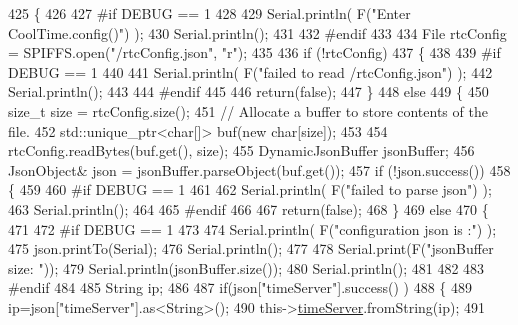 \begin{DoxyCode}
425 \{
426 
427 \textcolor{preprocessor}{#if DEBUG == 1 }
428 
429     Serial.println( F(\textcolor{stringliteral}{"Enter CoolTime.config()"}) );
430     Serial.println();
431 
432 \textcolor{preprocessor}{#endif }
433 
434     File rtcConfig = SPIFFS.open(\textcolor{stringliteral}{"/rtcConfig.json"}, \textcolor{stringliteral}{"r"});
435 
436     \textcolor{keywordflow}{if} (!rtcConfig) 
437     \{
438     
439 \textcolor{preprocessor}{    #if DEBUG == 1 }
440 
441         Serial.println( F(\textcolor{stringliteral}{"failed to read /rtcConfig.json"}) );
442         Serial.println();
443     
444 \textcolor{preprocessor}{    #endif}
445 
446         \textcolor{keywordflow}{return}(\textcolor{keyword}{false});
447     \}
448     \textcolor{keywordflow}{else}
449     \{
450         \textcolor{keywordtype}{size\_t} size = rtcConfig.size();
451         \textcolor{comment}{// Allocate a buffer to store contents of the file.}
452         std::unique\_ptr<char[]> buf(\textcolor{keyword}{new} \textcolor{keywordtype}{char}[size]);
453 
454         rtcConfig.readBytes(buf.get(), size);
455         DynamicJsonBuffer jsonBuffer;
456         JsonObject& json = jsonBuffer.parseObject(buf.get());
457         \textcolor{keywordflow}{if} (!json.success()) 
458         \{
459         
460 \textcolor{preprocessor}{        #if DEBUG == 1 }
461 
462             Serial.println( F(\textcolor{stringliteral}{"failed to parse json"}) );
463             Serial.println();
464         
465 \textcolor{preprocessor}{        #endif }
466 
467             \textcolor{keywordflow}{return}(\textcolor{keyword}{false});
468         \} 
469         \textcolor{keywordflow}{else}
470         \{  
471         
472 \textcolor{preprocessor}{        #if DEBUG == 1 }
473 
474             Serial.println( F(\textcolor{stringliteral}{"configuration json is :"}) );
475             json.printTo(Serial);
476             Serial.println();
477 
478             Serial.print(F(\textcolor{stringliteral}{"jsonBuffer size: "}));
479             Serial.println(jsonBuffer.size());
480             Serial.println();
481 
482 
483 \textcolor{preprocessor}{        #endif}
484 
485             String ip;
486             
487             \textcolor{keywordflow}{if}(json[\textcolor{stringliteral}{"timeServer"}].success() )
488             \{           
489                  ip=json[\textcolor{stringliteral}{"timeServer"}].as<String>();
490                 this->\hyperlink{classCoolTime_ad2b9858f399108cb440dd1e908916f04}{timeServer}.fromString(ip);
491                 

\end{DoxyCode}
